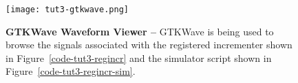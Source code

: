
\begin{figure}

  \texttt{[image: tut3-gtkwave.png]}

  \caption{\textbf{GTKWave Waveform Viewer --} GTKWave is being used to
    browse the signals associated with the registered incrementer shown
    in Figure~\ref{code-tut3-regincr} and the simulator script shown in
    Figure~\ref{code-tut3-regincr-sim}.}
  \label{fig-tut3-gtkwave}

\end{figure}

